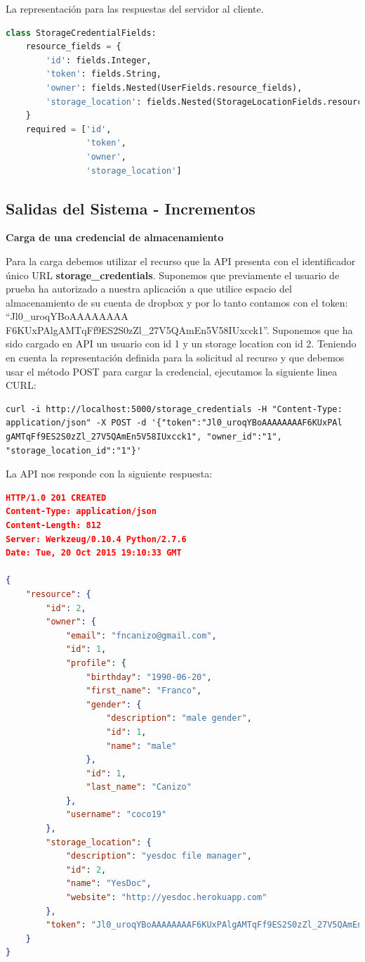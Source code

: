 \documentclass[a4paper,12pt]{article}
\begin{document}
La representación para las respuestas del servidor al cliente.

\begin{lstlisting}[language=Python]
class StorageCredentialFields:
    resource_fields = {
        'id': fields.Integer,
        'token': fields.String,
        'owner': fields.Nested(UserFields.resource_fields),
        'storage_location': fields.Nested(StorageLocationFields.resource_fields),
    }
    required = ['id',
                'token',
                'owner',
                'storage_location']
\end{lstlisting}



\subsection {Salidas del Sistema - Incrementos}
\textbf{Carga de una credencial de almacenamiento}

Para la carga debemos utilizar el recurso que la API presenta con el identificador único URL \textbf{\/storage\_credentials}. Suponemos que previamente el usuario de prueba ha autorizado a nuestra aplicación a que utilice espacio del almacenamiento de su cuenta de dropbox y por lo tanto contamos con el token: ``Jl0\_uroqYBoAAAAAAAA
F6KUxPAlgAMTqFf9ES2S0zZl\_27V5QAmEn5V58IUxcck1''. Suponemos que ha sido cargado en API un usuario con id 1 y un storage location con id 2. Teniendo en cuenta la representación definida para la solicitud al recurso y que debemos usar el método POST para cargar la credencial, ejecutamos la siguiente linea CURL:

\begin{verbatim}
curl -i http://localhost:5000/storage_credentials -H "Content-Type: 
application/json" -X POST -d '{"token":"Jl0_uroqYBoAAAAAAAAF6KUxPAl
gAMTqFf9ES2S0zZl_27V5QAmEn5V58IUxcck1", "owner_id":"1", 
"storage_location_id":"1"}'
\end{verbatim}

La API nos responde con la siguiente respuesta:

\begin{lstlisting}[language=json]
HTTP/1.0 201 CREATED
Content-Type: application/json
Content-Length: 812
Server: Werkzeug/0.10.4 Python/2.7.6
Date: Tue, 20 Oct 2015 19:10:33 GMT

{
    "resource": {
        "id": 2, 
        "owner": {
            "email": "fncanizo@gmail.com", 
            "id": 1, 
            "profile": {
                "birthday": "1990-06-20", 
                "first_name": "Franco", 
                "gender": {
                    "description": "male gender", 
                    "id": 1, 
                    "name": "male"
                }, 
                "id": 1, 
                "last_name": "Canizo"
            }, 
            "username": "coco19"
        }, 
        "storage_location": {
            "description": "yesdoc file manager", 
            "id": 2, 
            "name": "YesDoc", 
            "website": "http://yesdoc.herokuapp.com"
        }, 
        "token": "Jl0_uroqYBoAAAAAAAAF6KUxPAlgAMTqFf9ES2S0zZl_27V5QAmEn5V58IUxcck1"
    }
}
\end{lstlisting}
\end{document}
